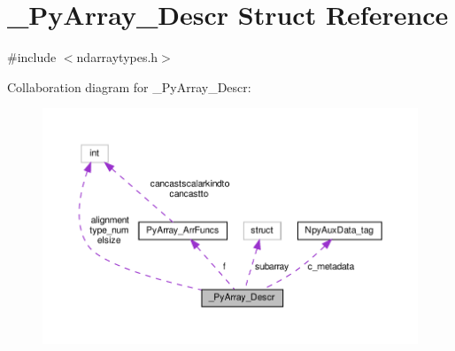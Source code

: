 \hypertarget{struct__PyArray__Descr}{}\section{\+\_\+\+Py\+Array\+\_\+\+Descr Struct Reference}
\label{struct__PyArray__Descr}


{\ttfamily \#include $<$ndarraytypes.\+h$>$}



Collaboration diagram for \+\_\+\+Py\+Array\+\_\+\+Descr\+:
\nopagebreak
\begin{figure}[H]
\begin{center}
\leavevmode
\includegraphics[width=350pt]{struct__PyArray__Descr__coll__graph}
\end{center}
\end{figure}
